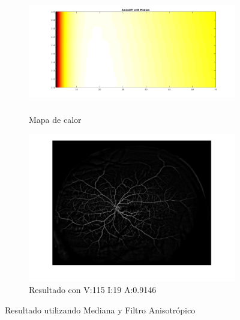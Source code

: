 \begin{figure}[H]
\begin{subfigure}[b]{0.48\textwidth}
        \includegraphics[height=5.3cm,width=1\textwidth]{./Figures/Results/anisodiffWithMedianColorMap.png}
        \caption{Mapa de calor}
        \label{fig:thermalforanisodiffwithmedianacentered}
  \end{subfigure}
  \begin{subfigure}[b]{0.48\textwidth}
        \includegraphics[width=1\textwidth]{./Figures/Results/anisodiffWithMedianV115I19A09146.png}
        \caption{Resultado con V:115 I:19 A:0.9146}
        \label{fig:thermalforanisodiffwithmedianacentered}
  \end{subfigure}
	\label{fig:thermalfigure}
	\caption{Resultado utilizando Mediana y Filtro Anisotr\'opico}
\end{figure}


